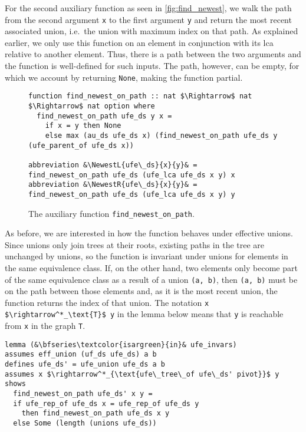 \documentclass[
  sigplan,
  10pt,
  anonymous,
  review,
  ]{acmart}
\newcommand{\NewestL}[3]{(#2 $\upharpoonleft$ #3)$_\text{#1}$}
\newcommand{\NewestR}[3]{(#2 $\upharpoonright$ #3)$_\text{#1}$}
\begin{document}
For the second auxiliary function as seen in \autoref{fig:find_newest}, we walk the path from the second argument \lstinline|x| to the first argument \lstinline|y| and return the most recent associated union, i.e.\ the union with maximum index on that path.
As explained earlier, we only use this function on an element in conjunction with its \acrshort{lca} relative to another element.
Thus, there is a path between the two arguments and the function is well-defined for such inputs.
The path, however, can be empty, for which we account by returning \lstinline|None|, making the function partial.
\begin{figure*}
  \begin{lstlisting}
function find_newest_on_path :: nat $\Rightarrow$ nat $\Rightarrow$ nat option where
  find_newest_on_path ufe_ds y x =
    if x = y then None
    else max (au_ds ufe_ds x) (find_newest_on_path ufe_ds y (ufe_parent_of ufe_ds x))

abbreviation &\NewestL{ufe\_ds}{x}{y}& = find_newest_on_path ufe_ds (ufe_lca ufe_ds x y) x
abbreviation &\NewestR{ufe\_ds}{x}{y}& = find_newest_on_path ufe_ds (ufe_lca ufe_ds x y) y 
  \end{lstlisting}
  \caption{The auxiliary function \lstinline|find_newest_on_path|.\label{fig:find_newest} }
\end{figure*}

As before, we are interested in how the function behaves under effective unions.
Since unions only join trees at their roots, existing paths in the tree are unchanged by unions,
so the function is invariant under unions for elements in the same equivalence class.
If, on the other hand, two elements only become part of the same equivalence class as a result of a union \lstinline|(a, b)|, then \lstinline|(a, b)| must be on the path between those elements and, as it is the most recent union, the function returns the index of that union.
The notation \lstinline|x $\rightarrow^*_\text{T}$ y| in the lemma below means that \lstinline|y| is reachable from \lstinline|x| in the graph \lstinline|T|.
\begin{lstlisting}
lemma (&\bfseries\textcolor{isargreen}{in}& ufe_invars)
assumes eff_union (uf_ds ufe_ds) a b
defines ufe_ds' = ufe_union ufe_ds a b
assumes x $\rightarrow^*_{\text{ufe\_tree\_of ufe\_ds' pivot}}$ y
shows
  find_newest_on_path ufe_ds' x y =
  if ufe_rep_of ufe_ds x = ufe_rep_of ufe_ds y
    then find_newest_on_path ufe_ds x y
  else Some (length (unions ufe_ds))
\end{lstlisting}
\end{document}

